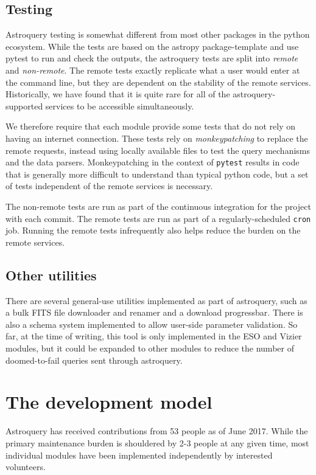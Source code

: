 \documentclass{article}
\begin{document}
\subsection{Testing}
Astroquery testing is somewhat different from most other packages in the python
ecosystem.  While the tests are based on the astropy package-template and use
pytest to run and check the outputs, the astroquery tests are split into
\emph{remote} and \emph{non-remote}.  The remote tests exactly replicate what a user
would enter at the command line, but they are dependent on the stability of the
remote services.  Historically, we have found that it is quite rare for all of
the astroquery-supported services to be accessible simultaneously.

We therefore require that each module provide some tests that do not rely on
having an internet connection.  These tests rely on \emph{monkeypatching} to
replace the remote requests, instead using locally available files to test the
query mechanisms and the data parsers.  Monkeypatching in the context of
\texttt{pytest} results in code that is generally more difficult to understand
than typical python code, but a set of tests independent of the remote services
is necessary.

The non-remote tests are run as part of the continuous integration for the
project with each commit.  The remote tests are run as part of a
regularly-scheduled \texttt{cron} job.  Running the remote tests infrequently
also helps reduce the burden on the remote services.

\subsection{Other utilities}
There are several general-use utilities implemented as part of astroquery, such
as a bulk FITS file downloader and renamer and a download progressbar.  There
is also a schema system implemented to allow user-side parameter validation.
So far, at the time of writing, this tool is only implemented in the ESO and
Vizier modules, but it could be expanded to other modules to reduce the number
of doomed-to-fail queries sent through astroquery.

\section{The development model}
\label{sec:development}
Astroquery has received contributions from 53 people as of June 2017.
While the primary maintenance burden is shouldered by 2-3 people at any given time,
most individual modules have been implemented independently by interested volunteers.
\end{document}
